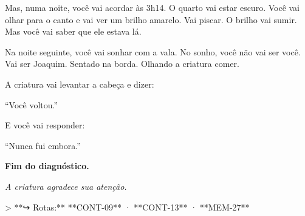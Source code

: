 \noindent Mas, numa noite, você vai acordar às 3h14. O quarto vai estar escuro. Você vai olhar para o canto e vai ver um brilho amarelo. Vai piscar. O brilho vai sumir. Mas você vai saber que ele estava lá.

\noindent Na noite seguinte, você vai sonhar com a vala. No sonho, você não vai ser você. Vai ser Joaquim. Sentado na borda. Olhando a criatura comer.

\noindent A criatura vai levantar a cabeça e dizer:

\noindent ``Você voltou.''

\noindent E você vai responder:

\noindent ``Nunca fui embora.''

\noindent \textbf{Fim do diagnóstico.}

\noindent \textit{A criatura agradece sua atenção.}

> **↪ Rotas:** **CONT-09** · **CONT-13** · **MEM-27**

